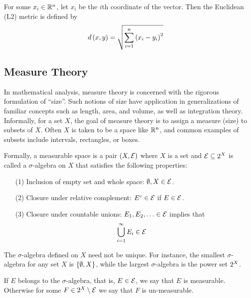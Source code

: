 \begin{example}
  For some \(x_i \in \mathbb{R}^n\),
  let \(x_i\) be the \(i\)th coordinate of the vector.
  Then the Euclidean (L2) metric is defined by
  \begin{align*}
    d\left(x, y\right)
      = \sqrt{\sum_{i = 1}^{n} \left(x_i - y_i\right)^2}
  \end{align*}
\end{example}


\subsection{Measure Theory}

In mathematical analysis, measure theory is concerned with
the rigorous formulation of ``size''.
Such notions of size have application in generalizations of
familiar concepts such as length, area, and volume,
as well as integration theory.
Informally, for a set \(X\),
the goal of measure theory is to assign a measure (size) to subsets of \(X\).
Often \(X\) is taken to be a space like \(\mathbb{R}^n\),
and common examples of subsets include intervals, rectangles, or boxes.


Formally, a measurable space is a pair
\(\left(X, \mathcal{E}\right)\) where
\(X\) is a set and \(\mathcal{E} \subseteq 2^{X}\) is called
a \(\sigma\)-algebra on \(X\) that satisfies the following properties:
\begin{enumerate}
  \item[(1)]
    Inclusion of empty set and whole space: \(\emptyset, X \in \mathcal{E}\).

  \item[(2)]
    Closure under relative complement:
    \(E^c \in \mathcal{E}\) if \(E \in \mathcal{E}\).

  \item[(3)]
    Closure under countable unions:
    \(E_1, E_2, \ldots \in \mathcal{E}\) implies that
    \begin{align*}
      \bigcup_{i = 1}^{\infty} E_i \in \mathcal{E}
    \end{align*}

\end{enumerate}

The \(\sigma\)-algebra defined on \(X\) need not be unique.
For instance, the smallest \(\sigma\)-algebra for any set \(X\)
is \(\left\{\emptyset, X\right\}\),
while the largest \(\sigma\)-algebra is the power set \(2^{X}\).

If \(E\) belongs to the \(\sigma\)-algebra,
that is, \(E \in \mathcal{E}\), we say that \(E\) is measurable.
Otherwise for some \(F \in 2^{X} \setminus \mathcal{E}\)
we say that \(F\) is un-measurable.

